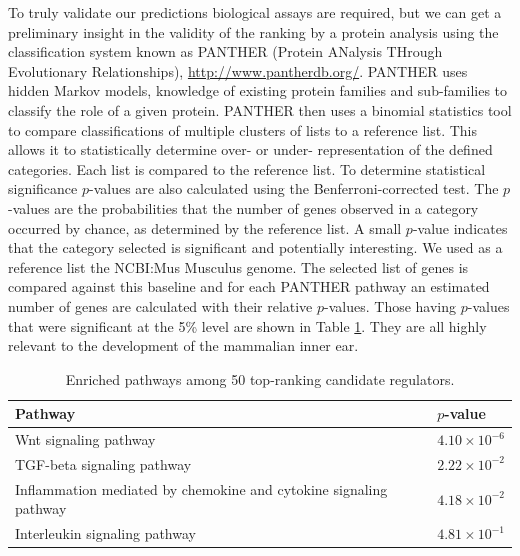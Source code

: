 \documentclass{article}
\begin{document}
To truly validate our  predictions biological assays are required, but
we can get  a preliminary insight in the validity of  the ranking by a
protein  analysis using  the  classification system  known as  PANTHER
(Protein     ANalysis     THrough     Evolutionary     Relationships),
\url{http://www.pantherdb.org/}.   PANTHER uses hidden  Markov models,
knowledge of  existing protein families and  sub-families to classify the
role of a given protein.  PANTHER then uses a binomial statistics tool
to  compare  classifications  of  multiple  clusters  of  lists  to  a
reference  list. This allows  it to  statistically determine  over- or
under- representation of the defined categories. Each list is compared
to   the  reference  list.   To  determine   statistical  significance
$p$-values  are   also  calculated  using   the   Benferroni-corrected
test. The  $p$-values are the  probabilities that the number  of genes
observed  in a  category  occurred  by chance,  as  determined by  the
reference list. A small $p$-value indicates that the category selected
is significant  and potentially interesting.   We used as  a reference
list  the NCBI:Mus  Musculus genome.  The  selected list  of genes  is
compared  against  this  baseline  and  for each  PANTHER  pathway  an
estimated  number   of  genes  are  calculated   with  their  relative
$p$-values. Those  having $p$-values that were significant  at the 5\%
level  are shown  in  Table \ref{tab:pathways}.  They  are all  highly
relevant to the development of the mammalian inner ear.

\begin{table}[tb]
  \caption{Enriched pathways among 50 top-ranking candidate regulators.}
  \label{tab:pathways}
 \centering
  \begin{tabularx}{\columnwidth}{Xl}
    Pathway & $p$-value \\
    \hline
    Wnt signaling pathway &	$4.10\times 10^{-6}$ \\
    TGF-beta signaling pathway & $2.22\times 10^{-2}$ \\
    Inflammation mediated by chemokine and cytokine signaling pathway & $4.18\times 10^{-2}$ \\
    Interleukin signaling pathway & $4.81\times 10^{-1}$\\
  \end{tabularx}
\end{table}
\end{document}
